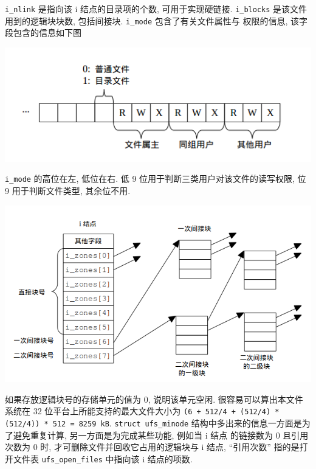 \documentclass[nofonts, titlepage]{ctexart}
\begin{document}
\texttt{i\_nlink} 是指向该 i 结点的目录项的个数, 可用于实现硬链接.
\texttt{i\_blocks} 是该文件用到的逻辑块块数, 包括间接块.
\texttt{i\_mode} 包含了有关文件属性与 权限的信息, 该字段包含的信息如下图

\begin{center}
\includegraphics[width=15cm]{./images/./imode.png}
\label{fig:i_mode}
\end{center}

\texttt{i\_mode} 的高位在左, 低位在右. 低 9
位用于判断三类用户对该文件的读写权限, 位 9 用于判断文件类型, 其余位不用.

\begin{center}
\includegraphics[width=15cm]{./images/./i_zones_array.png}
\label{fig:i_node}
\end{center}

如果存放逻辑块号的存储单元的值为 0, 说明该单元空闲.
很容易可以算出本文件系统在 32 位平台上所能支持的最大文件大小为
\texttt{(6 + 512/4 + (512/4) * (512/4)) * 512 = 8259 kB}.
\texttt{struct ufs\_minode} 结构中多出来的信息一方面是为了避免重复计算,
另一方面是为完成某些功能, 例如当 i 结点 的链接数为 0 且引用次数为 0 时,
才可删除文件并回收它占用的逻辑块与 i 结点, ``引用次数'' 指的是打开文件表
\texttt{ufs\_open\_files} 中指向该 i 结点的项数.
\end{document}
